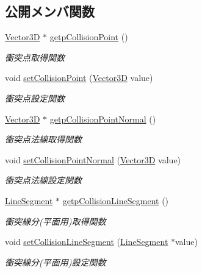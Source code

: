 \subsection*{公開メンバ関数}
\begin{DoxyCompactItemize}
\item 
\mbox{\hyperlink{class_vector3_d}{Vector3D}} $\ast$ \mbox{\hyperlink{class_collision_information_affce7016429a57e1283c2e3b424d2347}{getp\+Collision\+Point}} ()
\begin{DoxyCompactList}\small\item\em 衝突点取得関数 \end{DoxyCompactList}\item 
void \mbox{\hyperlink{class_collision_information_a299c2d8462f26dbacabb71029ba6ce4f}{set\+Collision\+Point}} (\mbox{\hyperlink{class_vector3_d}{Vector3D}} value)
\begin{DoxyCompactList}\small\item\em 衝突点設定関数 \end{DoxyCompactList}\item 
\mbox{\hyperlink{class_vector3_d}{Vector3D}} $\ast$ \mbox{\hyperlink{class_collision_information_a4146ab53569d6d52a4af94b21617ddf8}{getp\+Collision\+Point\+Normal}} ()
\begin{DoxyCompactList}\small\item\em 衝突点法線取得関数 \end{DoxyCompactList}\item 
void \mbox{\hyperlink{class_collision_information_ae4de2bbe47ac7de5587b27552cff995f}{set\+Collision\+Point\+Normal}} (\mbox{\hyperlink{class_vector3_d}{Vector3D}} value)
\begin{DoxyCompactList}\small\item\em 衝突点法線設定関数 \end{DoxyCompactList}\item 
\mbox{\hyperlink{class_line_segment}{Line\+Segment}} $\ast$ \mbox{\hyperlink{class_collision_information_a44fe1a01d5b65b29181d01fa164b7dd5}{getp\+Collision\+Line\+Segment}} ()
\begin{DoxyCompactList}\small\item\em 衝突線分(平面用)取得関数 \end{DoxyCompactList}\item 
void \mbox{\hyperlink{class_collision_information_aa36f3b7ded9b176039b09ccc69acbf2a}{set\+Collision\+Line\+Segment}} (\mbox{\hyperlink{class_line_segment}{Line\+Segment}} $\ast$value)
\begin{DoxyCompactList}\small\item\em 衝突線分(平面用)設定関数 \end{DoxyCompactList}\item 

\end{DoxyCompactItemize}
